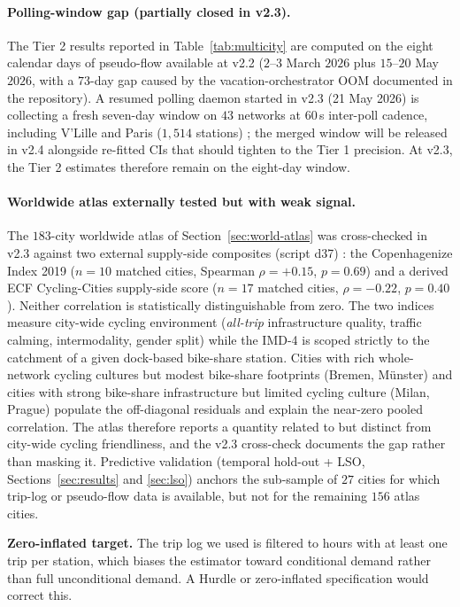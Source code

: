 \documentclass[11pt,a4paper]{article}
\begin{document}
\paragraph{Polling-window gap (partially closed in v2.3).}
The Tier 2 results reported in Table~\ref{tab:multicity} are
computed on the eight calendar days of pseudo-flow available
at v2.2 ($2$--$3$ March $2026$ plus $15$--$20$ May $2026$, with
a $73$-day gap caused by the vacation-orchestrator OOM
documented in the repository).  A resumed polling daemon
started in v2.3 (21 May 2026) is collecting a fresh seven-day
window on $43$ networks at $60$\,s inter-poll cadence, including
V'Lille and Paris ($1{,}514$ stations) ; the merged window will be
released in v2.4 alongside re-fitted CIs that should tighten to
the Tier 1 precision.  At v2.3, the Tier 2 estimates therefore
remain on the eight-day window.

\paragraph{Worldwide atlas externally tested but with weak signal.}
The $183$-city worldwide atlas of
Section~\ref{sec:world-atlas} was cross-checked in v2.3 against
two external supply-side composites (script d37) :
the Copenhagenize Index 2019 ($n = 10$ matched cities,
Spearman $\rho = +0.15$, $p = 0.69$) and a derived
ECF Cycling-Cities supply-side score
($n = 17$ matched cities, $\rho = -0.22$, $p = 0.40$).
Neither correlation is statistically distinguishable from zero.
The two indices measure city-wide cycling environment
(\emph{all-trip} infrastructure quality, traffic calming,
intermodality, gender split) while the IMD-4 is scoped
strictly to the catchment of a given dock-based bike-share
station.  Cities with rich whole-network cycling cultures but
modest bike-share footprints (Bremen, Münster) and cities with
strong bike-share infrastructure but limited cycling culture
(Milan, Prague) populate the off-diagonal residuals and explain
the near-zero pooled correlation.  The atlas therefore reports
a quantity related to but distinct from city-wide cycling
friendliness, and the v2.3 cross-check documents the gap rather
than masking it.  Predictive validation
(temporal hold-out + LSO, Sections~\ref{sec:results}
and \ref{sec:lso}) anchors the
sub-sample of $27$ cities for which trip-log or pseudo-flow
data is available, but not for the remaining $156$ atlas cities.

\textbf{Zero-inflated target.}  The trip log we used is filtered
to hours with at least one trip per station, which biases the
estimator toward conditional demand rather than full unconditional
demand.  A Hurdle or zero-inflated specification would correct
this.
\end{document}
